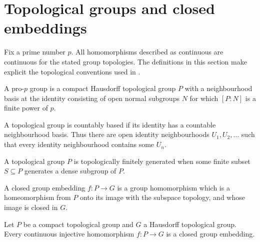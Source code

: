 \section{Topological groups and closed embeddings}

Fix a prime number $p$. All homomorphisms described as continuous are
continuous for the stated group topologies. The definitions in this section
make explicit the topological conventions used in
\cite{Camina1997}.

\begin{definition}
\label{def:pro-p-group}
\leanok
A pro-$p$ group is a compact Hausdorff topological group $P$ with a
neighbourhood basis at the identity consisting of open normal subgroups
$N$ for which $[P:N]$ is a finite power of $p$.
\end{definition}

\begin{definition}
\label{def:countably-based}
\mathlibok
A topological group is countably based if its identity has a countable
neighbourhood basis. Thus there are open identity neighbourhoods
$U_1,U_2,\ldots$ such that every identity neighbourhood contains some
$U_n$.
\end{definition}

\begin{definition}
\label{def:topologically-finitely-generated}
\leanok
A topological group $P$ is topologically finitely generated when some
finite subset $S\subseteq P$ generates a dense subgroup of $P$.
\end{definition}

\begin{definition}
\label{def:closed-group-embedding}
\mathlibok
A closed group embedding $f:P\longrightarrow G$ is a group homomorphism
which is a homeomorphism from $P$ onto its image with the subspace
topology, and whose image is closed in $G$.
\end{definition}

\begin{lemma}
\label{lem:compact-injection-closed-embedding}
\mathlibok
Let $P$ be a compact topological group and $G$ a Hausdorff topological
group. Every continuous injective homomorphism
$f:P\longrightarrow G$ is a closed group embedding.
\end{lemma}

